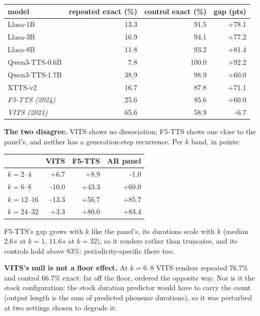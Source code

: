 \begin{center}
\begin{tabular}{lrrr}
\toprule
model & repeated exact (\%) & control exact (\%) & gap (pts) \\
\midrule
Llasa-1B & 13.3 & 91.5 & +78.1 \\
Llasa-3B & 16.9 & 94.1 & +77.2 \\
Llasa-8B & 11.8 & 93.2 & +81.4 \\
Qwen3-TTS-0.6B & 7.8 & 100.0 & +92.2 \\
Qwen3-TTS-1.7B & 38.9 & 98.9 & +60.0 \\
XTTS-v2 & 16.7 & 87.8 & +71.1 \\
\midrule
\emph{F5-TTS (2024)} & 25.6 & 85.6 & +60.0 \\
\emph{VITS (2021)} & 65.6 & 58.9 & -6.7 \\
\bottomrule
\end{tabular}
\end{center}

\noindent\textbf{The two disagree.} VITS shows no dissociation;
F5-TTS shows one close to the panel's, and neither has a
generation-step recurrence. Per $k$ band, in points:

\begin{center}
\begin{tabular}{lrrr}
\toprule
 & VITS & F5-TTS & AR panel \\
\midrule
$k=2$--$4$ & +6.7 & +8.9 & -1.0 \\
$k=6$--$8$ & -10.0 & +43.3 & +60.0 \\
$k=12$--$16$ & -13.3 & +56.7 & +85.7 \\
$k=24$--$32$ & +3.3 & +80.0 & +83.4 \\
\bottomrule
\end{tabular}
\end{center}

F5-TTS's gap grows with $k$ like the panel's, its durations scale with
$k$ (median $2.6$\,s at $k{=}1$, $11.6$\,s at $k{=}32$), so it renders
rather than truncates, and its controls hold above $83\%$:
periodicity-specific there too.

\noindent\textbf{VITS's null is not a floor effect.} At $k=6$--$8$
VITS renders repeated $76.7\%$ and control $66.7\%$ exact: far off the
floor, ordered the opposite way. Nor is it the stock configuration:
the stock duration predictor would have to carry the count (output
length is the sum of predicted phoneme durations), so it was perturbed
at two settings chosen to degrade it:

